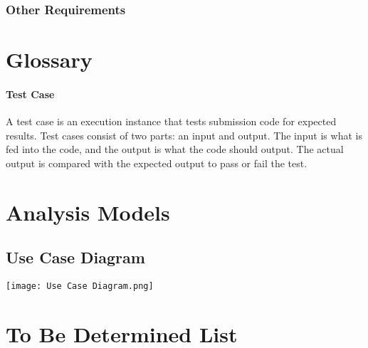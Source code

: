 \documentclass{article}
\begin{document}


\subsubsection{Other Requirements}

\newpage
\appendix


\section{Glossary}

\paragraph{Test Case} A test case is an execution instance that tests submission code for expected results. Test cases consist of two parts: an input and output. The input is what is fed into the code, and the output is what the code should output. The actual output is compared with the expected output to pass or fail the test.


\newpage
\section{Analysis Models}
\subsection{Use Case Diagram}
\texttt{[image: Use Case Diagram.png]}

\newpage
\section{To Be Determined List}
\end{document}
